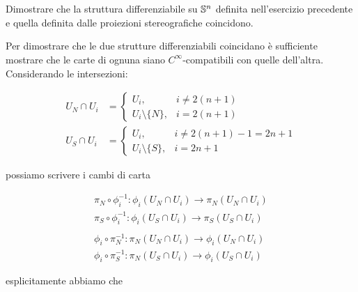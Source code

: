 %

\section{}\label{es2-2}

\begin{tcolorbox}
	Dimostrare che la struttura differenziabile su $ \S^{n} $ definita nell’esercizio precedente e quella definita dalle proiezioni
	stereografiche coincidono.
\end{tcolorbox}

Per dimostrare che le due strutture differenziabili coincidano è sufficiente mostrare che le carte di ognuna siano $ C^{\infty} $-compatibili con quelle dell'altra.\\
Considerando le intersezioni:

\begin{align}
		U_{N} \cap U_{i} &= %
		\begin{cases}
			U_{i}, & i \neq 2(n+1)\\
			U_{i} \setminus \{ N \}, & i = 2(n+1)
		\end{cases}\\
		U_{S} \cap U_{i} &= %
		\begin{cases}
			U_{i}, & i \neq 2(n+1) - 1 = 2 n + 1\\
			U_{i} \setminus \{ S \}, & i = 2n+1
		\end{cases}
\end{align}

possiamo scrivere i cambi di carta

\begin{gather}
	\pi_{N} \circ \phi_{i}^{-1} : \phi_{i}(U_{N} \cap U_{i}) \to \pi_{N}(U_{N} \cap U_{i})\\
	\pi_{S} \circ \phi_{i}^{-1} : \phi_{i}(U_{S} \cap U_{i}) \to \pi_{S}(U_{S} \cap U_{i})\\
	\nonumber\\
	\phi_{i} \circ \pi_{N}^{-1} : \pi_{N}(U_{N} \cap U_{i}) \to \phi_{i}(U_{N} \cap U_{i})\\
	\phi_{i} \circ \pi_{S}^{-1} : \pi_{N}(U_{S} \cap U_{i}) \to \phi_{i}(U_{S} \cap U_{i})
\end{gather}

esplicitamente abbiamo che

